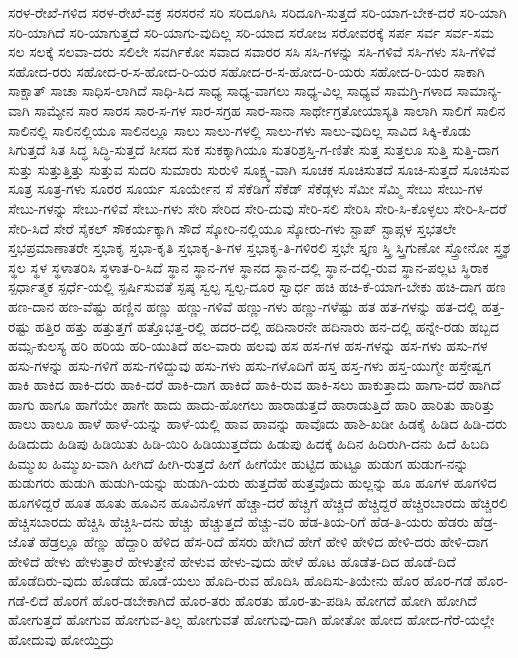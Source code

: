 {ಸರಳ-ರೇಖೆ-ಗಳಿದ
ಸರಳ-ರೇಖೆ-ವಕ್ರ
ಸರಸರನೆ
ಸರಿ
ಸರಿದೂಗಿಸಿ
ಸರಿದೂಗಿ-ಸುತ್ತದೆ
ಸರಿ-ಯಾಗ-ಬೇಕ-ದರೆ
ಸರಿ-ಯಾಗಿ
ಸರಿ-ಯಾಗಿದೆ
ಸರಿ-ಯಾಗುತ್ತದೆ
ಸರಿ-ಯಾಗು-ವುದಿಲ್ಲ
ಸರಿ-ಯಾದ
ಸರೋಜ
ಸರೋವರಕ್ಕೆ
ಸರ್ಪ
ಸರ್ವ
ಸರ್ವ-ಸಮ
ಸಲ
ಸಲಕ್ಕೆ
ಸಲವಾ-ದರು
ಸಲಿಲೇ
ಸವರ್ಗಿಕೋ
ಸವಾದ
ಸವಾರರ
ಸಸಿ
ಸಸಿ-ಗಳನ್ನು
ಸಸಿ-ಗಳಿವೆ
ಸಸಿ-ಗಳು
ಸಸಿ-ಗೆಳಿವೆ
ಸಹೋದ-ರರು
ಸಹೋದ-ರ-ಸ-ಹೋದ-ರಿ-ಯರ
ಸಹೋದ-ರ-ಸ-ಹೋದ-ರಿ-ಯರು
ಸಹೋದ-ರಿ-ಯರ
ಸಾಕಾಗಿ
ಸಾಕ್ಷಾತ್
ಸಾಚಾ
ಸಾಧಿಸ-ಲಾಗಿದೆ
ಸಾಧಿ-ಸಿದ
ಸಾಧ್ಯ
ಸಾಧ್ಯ-ವಾಗಲು
ಸಾಧ್ಯ-ವಿಲ್ಲ
ಸಾಧ್ಯವೆ
ಸಾಮಗ್ರಿ-ಗಳಾದ
ಸಾಮಾನ್ಯ-ವಾಗಿ
ಸಾಮ್ಯೇನ
ಸಾರ
ಸಾರಸ
ಸಾರ-ಸ-ಗಳ
ಸಾರ-ಸಗ್ರಹ
ಸಾರ-ಸಾನಾ
ಸಾರ್ಥೇಗ್ರತೋಯಾಸ್ಯತಿ
ಸಾಲಾಗಿ
ಸಾಲಿಗೆ
ಸಾಲಿನ
ಸಾಲಿನಲ್ಲಿ
ಸಾಲಿನಲ್ಲಿಯೂ
ಸಾಲಿನಲ್ಲೂ
ಸಾಲು
ಸಾಲು-ಗಳಲ್ಲಿ
ಸಾಲು-ಗಳು
ಸಾಲು-ವುದಿಲ್ಲ
ಸಾವಿದ
ಸಿಕ್ಕಿ-ಕೊಡು
ಸಿಗುತ್ತದೆ
ಸಿತ
ಸಿದ್ಧ
ಸಿದ್ಧಿ-ಸುತ್ತದೆ
ಸೀಸದ
ಸುಕ
ಸುಕಕ್ಕಾಗಿಯೂ
ಸುತರಿಶ್ರಸ್ತಿ-ಗ-ಣಿತೇ
ಸುತ್ತ
ಸುತ್ತಲೂ
ಸುತ್ತಿ
ಸುತ್ತಿ-ದಾಗ
ಸುತ್ತು
ಸುತ್ತುತ್ತಿತ್ತು
ಸುತ್ತುವ
ಸುದರಿ
ಸುಮಾರು
ಸುರುಳಿ
ಸೂಕ್ಷ್ಮ-ವಾಗಿ
ಸೂಚಕ
ಸೂಚಿಸುತದೆ
ಸೂಚಿ-ಸುತ್ತದೆ
ಸೂಚಿಸುವ
ಸೂತ್ರ
ಸೂತ್ರ-ಗಳು
ಸೂರರ
ಸೂರ್ಯ
ಸೂರ್ಯೇನ
ಸೆ
ಸೆಕೆಡಿಗೆ
ಸೆಕೆಡ್
ಸೆಕೆಡ್ಗಳು
ಸೆಮೀ
ಸೆಮ್ಮಿ
ಸೇಬು
ಸೇಬು-ಗಳ
ಸೇಬು-ಗಳನ್ನು
ಸೇಬು-ಗಳಿವೆ
ಸೇಬು-ಗಳು
ಸೇರಿ
ಸೇರಿದ
ಸೇರಿ-ದುವು
ಸೇರಿ-ಸಲಿ
ಸೇರಿಸಿ
ಸೇರಿ-ಸಿ-ಕೊಳ್ಳಲು
ಸೇರಿ-ಸಿ-ದರೆ
ಸೇರಿ-ಸಿದೆ
ಸೇರೆ
ಸೈಕಲ್
ಸೌಕರ್ಯಕ್ಕಾಗಿ
ಸೌದೆ
ಸ್ಕೋರಿ-ನಲ್ಲಿಯೂ
ಸ್ಕೋರು-ಗಳು
ಸ್ಟಾಪ್
ಸ್ಟಾಪ್ಗಳ
ಸ್ತಭತಲೇ
ಸ್ತಭಪ್ರಮಾಣಾತರೇ
ಸ್ತಭಾಕೃ
ಸ್ತಭಾ-ಕೃತಿ
ಸ್ತಭಾಕೃ-ತಿ-ಗಳ
ಸ್ತಭಾಕೃ-ತಿ-ಗಳಿರಲಿ
ಸ್ತಭೇ
ಸ್ತೃಣ
ಸ್ತ್ರಿ
ಸ್ತ್ರಿಗುಣೋ
ಸ್ತ್ರೋನೋ
ಸ್ತ್ರ್ಯಶ
ಸ್ಥಲ
ಸ್ಥಳ
ಸ್ಥಳಾತರಿಸಿ
ಸ್ಥಳಾತ-ರಿ-ಸಿದೆ
ಸ್ಥಾನ
ಸ್ಥಾನ-ಗಳ
ಸ್ಥಾನದ
ಸ್ಥಾನ-ದಲ್ಲಿ
ಸ್ಥಾನ-ದಲ್ಲಿ-ರುವ
ಸ್ಥಾನ-ಪಲ್ಲಟ
ಸ್ಥಿರಾಕ
ಸ್ಪರ್ಧಾತ್ಮಕ
ಸ್ಪರ್ಧೆ-ಯಲ್ಲಿ
ಸ್ಪರ್ಷಿಸುವತೆ
ಸ್ಪಷ್ಠ
ಸ್ವಲ್ಪ
ಸ್ವಲ್ಪ-ದೂರ
ಸ್ವಾರ್ಧ
ಹಚಿ
ಹಚಿ-ಕೆ-ಯಾಗ-ಬೇಕು
ಹಚಿ-ದಾಗ
ಹಣ
ಹಣ-ದಾನ
ಹಣ-ವೆಷ್ಟು
ಹಣ್ಣಿನ
ಹಣ್ಣು
ಹಣ್ಣು-ಗಳಿವೆ
ಹಣ್ಣು-ಗಳು
ಹಣ್ಣು-ಗಳೆಷ್ಟು
ಹತ
ಹತ-ಗಳನ್ನು
ಹತ-ದಲ್ಲಿ
ಹತ್ತ-ರಷ್ಟು
ಹತ್ತಿರ
ಹತ್ತು
ಹತ್ತುತ್ತಗೆ
ಹತ್ತೊಭತ್ತ-ರಲ್ಲಿ
ಹದರ-ದಲ್ಲಿ
ಹದಿನಾರನೇ
ಹದಿನಾರು
ಹನ-ದಲ್ಲಿ
ಹನ್ನೇ-ರಡು
ಹಬ್ಬದ
ಹಮ್ಸ-ಕುಲಸ್ಯ
ಹರಿ
ಹರಿಯ
ಹರಿ-ಯುತಿದೆ
ಹಲ-ವಾರು
ಹಲವು
ಹಸ
ಹಸ-ಗಳ
ಹಸ-ಗಳನ್ನು
ಹಸ-ಗಳು
ಹಸು-ಗಳ
ಹಸು-ಗಳನ್ನು
ಹಸು-ಗಳಿಗೆ
ಹಸು-ಗಳಿದ್ದುವು
ಹಸು-ಗಳು
ಹಸು-ಗಳೊದಿಗೆ
ಹಸ್ತ
ಹಸ್ತ-ಗಳು
ಹಸ್ತ-ಯುಗ್ಮೇ
ಹಸ್ತೇಷ್ವಗ
ಹಾಕಿ
ಹಾಕಿದ
ಹಾಕಿ-ದರು
ಹಾಕಿ-ದರೆ
ಹಾಕಿ-ದಾಗ
ಹಾಕಿದೆ
ಹಾಕಿ-ರುವ
ಹಾಕಿ-ಸಲು
ಹಾಕುತ್ತಾದು
ಹಾಗಾ-ದರೆ
ಹಾಗಿದೆ
ಹಾಗು
ಹಾಗೂ
ಹಾಗೆಯೇ
ಹಾಗೇ
ಹಾದು
ಹಾದು-ಹೋಗಲು
ಹಾರಾಡುತ್ತದೆ
ಹಾರಾಡುತ್ತಿದೆ
ಹಾರಿ
ಹಾರಿತು
ಹಾರಿತ್ತು
ಹಾಲು
ಹಾಲೂ
ಹಾಳೆ
ಹಾಳೆ-ಯನ್ನು
ಹಾಳೆ-ಯಲ್ಲಿ
ಹಾವ
ಹಾವನ್ನು
ಹಾವೊದು
ಹಾಶಿ-ಖಡೀ
ಹಿಡಕೈ
ಹಿಡಿದ
ಹಿಡಿ-ದರು
ಹಿಡಿದುದು
ಹಿಡಿಪು
ಹಿಡಿಯಿತು
ಹಿಡಿ-ಯಿರಿ
ಹಿಡಿಯುತ್ತದೆದು
ಹಿಡುಪು
ಹಿದಕ್ಕೆ
ಹಿದಿನ
ಹಿದಿರುಗಿ-ದನು
ಹಿದೆ
ಹಿಬದಿ
ಹಿಮ್ಮುಖ
ಹಿಮ್ಮುಖ-ವಾಗಿ
ಹೀಗಿದೆ
ಹೀಗಿ-ರುತ್ತದೆ
ಹೀಗೆ
ಹೀಗೆಯೇ
ಹುಟ್ಟಿದ
ಹುಟ್ಟೂ
ಹುಡುಗ
ಹುಡುಗ-ನನ್ನು
ಹುಡುಗರು
ಹುಡುಗಿ
ಹುಡುಗಿ-ಯನ್ನು
ಹುಡುಗಿ-ಯರು
ಹುತ್ತದೆಹೆ
ಹುತ್ತವೊದು
ಹುಲ್ಲನ್ನು
ಹೂ
ಹೂಗಳ
ಹೂಗಳಿದ
ಹೂಗಳಿದ್ದರೆ
ಹೂತ
ಹೂತು
ಹೂವಿನ
ಹೂವಿನೊಳಗೆ
ಹೆಚ್ಚಾ-ದರೆ
ಹೆಚ್ಚಿಗೆ
ಹೆಚ್ಚಿದೆ
ಹೆಚ್ಚಿದ್ದರೆ
ಹೆಚ್ಚಿರಬಾರದು
ಹೆಚ್ಚಿರಲಿ
ಹೆಚ್ಚಿಸಬಾರದು
ಹೆಚ್ಚಿಸಿ
ಹೆಚ್ಚಿಸಿ-ದನು
ಹೆಚ್ಚು
ಹೆಚ್ಚುತ್ತದೆ
ಹೆಚ್ಚು-ವರಿ
ಹೆಡ-ತಿಯ-ರಿಗೆ
ಹೆಡ-ತಿ-ಯರು
ಹೆಡರು
ಹೆಡ್ರ-ಜೊತೆ
ಹೆಡ್ರಲ್ಲೂ
ಹೆಣ್ಣು
ಹೆದ್ದಾರಿ
ಹೆಳಿದ
ಹೆಸ-ರಿದೆ
ಹೆಸರು
ಹೇಗಿದೆ
ಹೇಗೆ
ಹೇಳಿ
ಹೇಳಿದ
ಹೇಳಿ-ದರು
ಹೇಳಿ-ದಾಗ
ಹೇಳಿದೆ
ಹೇಳು
ಹೇಳುತ್ತಾರೆ
ಹೇಳುತ್ತೇನೆ
ಹೇಳುವ
ಹೇಳು-ವುದು
ಹೇಳೆ
ಹೊಟ
ಹೊಡೆತ-ದಿದ
ಹೊಡೆ-ದಿದೆ
ಹೊಡೆದಿರು-ವುದು
ಹೊಡೆದು
ಹೊಡೆ-ಯಲು
ಹೊದಿ-ರುವ
ಹೊದಿಸಿ
ಹೊದಿಸು-ತಿಯೇನು
ಹೊರ
ಹೊರ-ಗಡೆ
ಹೊರ-ಗಡೆ-ಲಿದೆ
ಹೊರಗೆ
ಹೊರ-ಡಬೇಕಾಗಿದೆ
ಹೊರ-ತರು
ಹೊರತು
ಹೊರ-ತು-ಪಡಿಸಿ
ಹೋಗದೆ
ಹೋಗಿ
ಹೋಗಿದೆ
ಹೋಗುತ್ತದೆ
ಹೋಗುವ
ಹೋಗುವ-ತಿಲ್ಲ
ಹೋಗುವತೆ
ಹೋಗುವು-ದಾಗಿ
ಹೋತೋ
ಹೋದ
ಹೋದ-ಗೆರೆ-ಯಲ್ಲೇ
ಹೋದುವು
ಹೋಯ್ತಿದ್ರು
}
